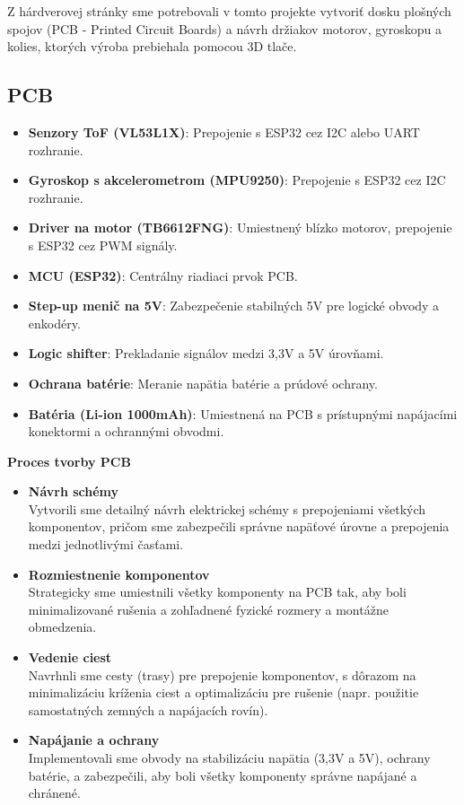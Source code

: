 Z hárdverovej stránky sme potrebovali v tomto projekte vytvoriť dosku plošných spojov (PCB - Printed Circuit Boards) a návrh držiakov motorov, gyroskopu a kolies, ktorých výroba prebiehala pomocou 3D tlače.
\subsection{PCB}
\begin{itemize}
    \item \textbf{Senzory ToF (VL53L1X)}: Prepojenie s ESP32 cez I2C alebo UART rozhranie.
    \item \textbf{Gyroskop s akcelerometrom (MPU9250)}: Prepojenie s ESP32 cez I2C rozhranie.
    \item \textbf{Driver na motor (TB6612FNG)}: Umiestnený blízko motorov, prepojenie s ESP32 cez PWM signály.
    \item \textbf{MCU (ESP32)}: Centrálny riadiaci prvok PCB.
    \item \textbf{Step-up menič na 5V}: Zabezpečenie stabilných 5V pre logické obvody a enkodéry.
    \item \textbf{Logic shifter}: Prekladanie signálov medzi 3,3V a 5V úrovňami.
    \item \textbf{Ochrana batérie}: Meranie napätia batérie a prúdové ochrany.
    \item \textbf{Batéria (Li-ion 1000mAh)}: Umiestnená na PCB s prístupnými napájacími konektormi a ochrannými obvodmi.
\end{itemize}

\textbf{Proces tvorby PCB}
\begin{itemize}

\item \textbf{Návrh schémy}\\
Vytvorili sme detailný návrh elektrickej schémy s prepojeniami všetkých komponentov, pričom sme zabezpečili správne napäťové úrovne a prepojenia medzi jednotlivými časťami.

\item \textbf{Rozmiestnenie komponentov}\\
Strategicky sme umiestnili všetky komponenty na PCB tak, aby boli minimalizované rušenia a zohľadnené fyzické rozmery a montážne obmedzenia.

\item \textbf{Vedenie ciest}\\
Navrhnli sme cesty (trasy) pre prepojenie komponentov, s dôrazom na minimalizáciu kríženia ciest a optimalizáciu pre rušenie (napr. použitie samostatných zemných a napájacích rovín).

\item \textbf{Napájanie a ochrany}\\
Implementovali sme obvody na stabilizáciu napätia (3,3V a 5V), ochrany batérie, a zabezpečili, aby boli všetky komponenty správne napájané a chránené.
 
\end{itemize}

